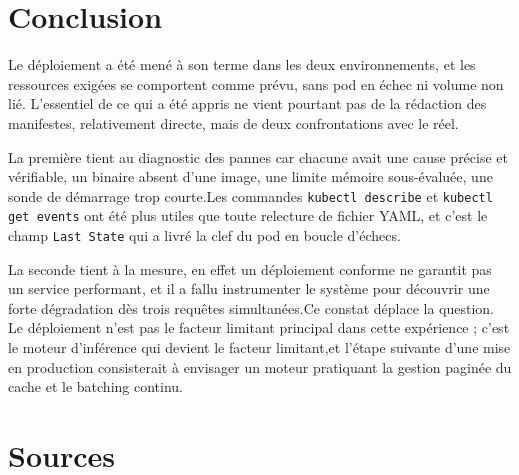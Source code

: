 \documentclass[10pt,a4paper]{article}
\begin{document}
\section{Conclusion}

Le déploiement a été mené à son terme dans les deux environnements, et les
ressources exigées se comportent comme prévu, sans pod en échec ni volume non
lié. L'essentiel de ce qui a été appris ne vient pourtant pas de la rédaction
des manifestes, relativement directe, mais de deux confrontations avec le réel.

La première tient au diagnostic des pannes car chacune avait une cause précise et
vérifiable, un binaire absent d'une image, une limite mémoire sous-évaluée,
une sonde de démarrage trop courte.Les commandes
\texttt{kubectl describe} et \texttt{kubectl get events} ont été plus utiles
que toute relecture de fichier YAML, et c'est le champ \texttt{Last State}
qui a livré la clef du pod en boucle d'échecs.

La seconde tient à la mesure, en effet un déploiement conforme ne garantit pas un service
performant, et il a fallu instrumenter le système pour découvrir une forte
dégradation dès trois requêtes simultanées.Ce constat déplace la question.
Le déploiement n'est pas le facteur limitant principal dans cette expérience ;
c'est le moteur d'inférence qui devient le facteur limitant,et l'étape suivante
d'une mise en production consisterait à envisager un moteur pratiquant la
gestion paginée du cache et le batching continu.

\section*{Sources}
\end{document}
